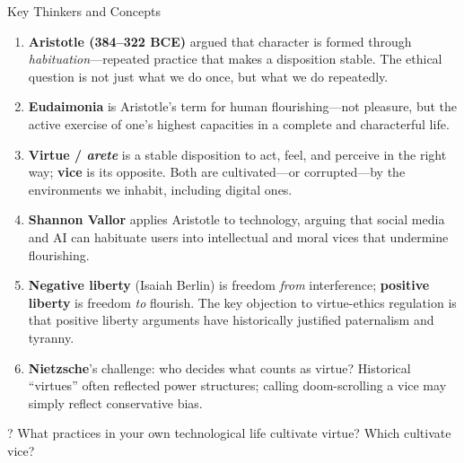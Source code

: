 \documentclass[aspectratio=169]{beamer}
\begin{document}
\begin{frame}{Key Thinkers and Concepts}
{\footnotesize
\begin{enumerate}
    \item \textbf{Aristotle (384--322 BCE)} argued that character is formed through \textit{habituation}---repeated practice that makes a disposition stable. The ethical question is not just what we do once, but what we do repeatedly.
    \item \textbf{Eudaimonia} is Aristotle's term for human flourishing---not pleasure, but the active exercise of one's highest capacities in a complete and characterful life.
    \item \textbf{Virtue / \textit{arete}} is a stable disposition to act, feel, and perceive in the right way; \textbf{vice} is its opposite. Both are cultivated---or corrupted---by the environments we inhabit, including digital ones.
    \item \textbf{Shannon Vallor} applies Aristotle to technology, arguing that social media and AI can habituate users into intellectual and moral vices that undermine flourishing.
    \item \textbf{Negative liberty} (Isaiah Berlin) is freedom \textit{from} interference; \textbf{positive liberty} is freedom \textit{to} flourish. The key objection to virtue-ethics regulation is that positive liberty arguments have historically justified paternalism and tyranny.
    \item \textbf{Nietzsche}'s challenge: who decides what counts as virtue? Historical ``virtues'' often reflected power structures; calling doom-scrolling a vice may simply reflect conservative bias.
\end{enumerate}
}

\begin{alertblock}{?}
What practices in your own technological life cultivate virtue? Which cultivate vice?
\end{alertblock}
\end{frame}
\end{document}

